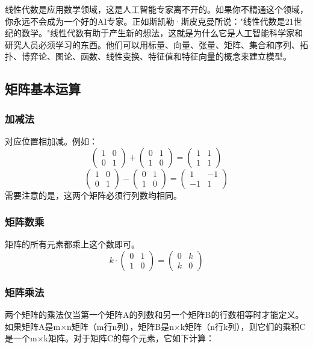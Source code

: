 线性代数是应用数学领域，这是人工智能专家离不开的。如果你不精通这个领域，你永远不会成为一个好的AI专家。正如斯凯勒·斯皮克曼所说："线性代数是21世纪的数学。"线性代数有助于产生新的想法，这就是为什么它是人工智能科学家和研究人员必须学习的东西。他们可以用标量、向量、张量、矩阵、集合和序列、拓扑、博弈论、图论、函数、线性变换、特征值和特征向量的概念来建立模型。

\subsection{矩阵基本运算}

\subsubsection{加减法}
对应位置相加减。例如：
$$\begin{pmatrix}1&0\\0&1\end{pmatrix}+\begin{pmatrix}0&1\\1&0\end{pmatrix}=\begin{pmatrix}1&1\\1&1\end{pmatrix}$$
$$\begin{pmatrix}1&0\\0&1\end{pmatrix}-\begin{pmatrix}0&1\\1&0\end{pmatrix}=\begin{pmatrix}1&-1\\-1&1\end{pmatrix}$$
需要注意的是，这两个矩阵必须行列数均相同。

\subsubsection{矩阵数乘}
矩阵的所有元素都乘上这个数即可。
$$k\cdot\begin{pmatrix}0&1\\1&0\end{pmatrix}=\begin{pmatrix}0&k\\k&0\end{pmatrix}$$

\subsubsection{矩阵乘法}
两个矩阵的乘法仅当第一个矩阵A的列数和另一个矩阵B的行数相等时才能定义。如果矩阵A是m×n矩阵（m行n列），矩阵B是n×k矩阵（n行k列），则它们的乘积C是一个m×k矩阵。对于矩阵C的每个元素，它如下计算：

